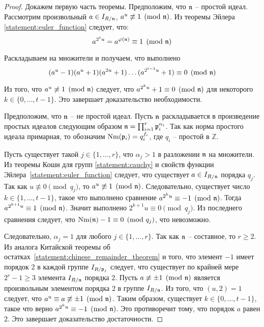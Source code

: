 \documentclass[_00_dissertation.tex]{subfiles}
\begin{document}
\begin{proof}
    Докажем первую часть теоремы.
    Предположим, что $\mathfrak{n}$ -- простой идеал.
    Рассмотрим произвольный $a \in I_{R/\mathfrak{n}}$, $a^u \not\equiv 1 \pmod{\mathfrak{n}}$.
    Из теоремы Эйлера \ref{statement:euler_function} следует, что:
    \begin{equation*}
        a^{2^{t} u} = a^{\varphi(\mathfrak{n})} \equiv 1 \pmod{\mathfrak{n}}
    \end{equation*}

    Раскладываем на множители и получаем, что выполнено
    \begin{equation*}
        (a^{u} - 1)(a^{u} + 1)(a^{2u} + 1)\dots(a^{2^{t-1}u} + 1) \equiv 0 \pmod{\mathfrak{n}}
    \end{equation*}

    Из того, что $a^{u} \not\equiv 1 \pmod{\mathfrak{n}}$ следует, что $a^{2^{k}u} + 1 \equiv 0 \pmod{\mathfrak{n}}$ для некоторого $k\in \{0, \dots, t-1\}$.
    Это завершает доказательство необходимости.

    Предположим, что $\mathfrak{n}$ -- не простой идеал.
    Пусть $\mathfrak{n}$ раскладывается в произведение простых идеалов следующим образом $\mathfrak{n} = \prod_{i=1}^{r} \mathfrak{p}_i^{\alpha_i}$.
    Так как норма простого идеала примарная, то обозначим $\textrm{Nm}(\mathfrak{p}_i) = q_i^{f_i}$, где $q_i$ -- простой в $\mathbb{Z}$.

    Пусть существует такой $j \in \{1, \dots, r\}$, что $\alpha_j > 1$ в разложении $\mathfrak{n}$ на множители.
    Из теоремы Коши для групп \ref{statement:cauchy} и свойств функции Эйлера~\ref{statement:euler_function} следует, что существует $a \in I_{R/\mathfrak{n}}$ порядка $q_j$.
    Так как $u \not\equiv 0 \pmod{q_j}$, то $a^u \not\equiv 1 \pmod{\mathfrak{n}}$.
    Следовательно, существует число $k \in \{1, \dots, t-1\}$, такое что выполнено сравнение $a^{2^{k}u} \equiv -1 \pmod{\mathfrak{n}}$.
    Тогда $a^{2^{k+1}u} \equiv 1 \pmod{\mathfrak{n}}$.
    Значит выполнено $2^{k+1}u \equiv 0 \pmod{q_j}$.
    Из последнего сравнения следует, что $\textrm{Nm}(\mathfrak{n}) - 1 \equiv 0 \pmod{q_j}$, что невозможно.
    
    Следовательно, $\alpha_j = 1$ для любого $j \in \{1, \ldots, r\}$.
    Так как $\mathfrak{n}$ -- составное, то $r \ge 2$.
    Из аналога Китайской теоремы об остатках~\ref{statement:chinese_remainder_theorem} и того, что элемент $-1$ имеет порядок $2$ в каждой группе $I_{R/\mathfrak{p}_j}$ следует, что существует по крайней мере $2^r-1 \ge 3$ элемента $I_{R/\mathfrak{n}}$ порядка $2$.
    Пусть $a \not\equiv \pm 1 \pmod{\mathfrak{n}}$ является произвольным элементом порядка $2$ в группе $I_{R/\mathfrak{n}}$.
    Из того, что $(u, 2) = 1$ следует, что $a^u \equiv a \not\equiv \pm 1 \pmod{\mathfrak{n}}$.
    Таким образом, существует $k \in \{0,\ldots, t-1\}$, такое что верно $a^{2^{k}u} \equiv -1 \pmod{\mathfrak{n}}$.
    Это противоречит тому, что порядок $a$ равен $2$.
    Это завершает доказательство достаточности.


\end{proof}
\end{document}
